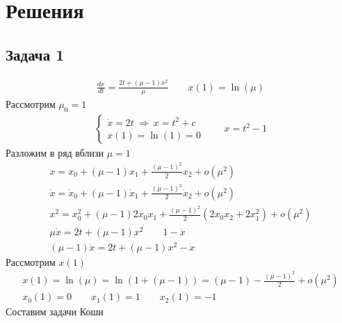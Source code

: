 
\newpage
\section*{Решения}
\subsection*{Задача 1}
	\begin{gather*}
	\frac{d x}{d t} = \frac{2t + (\mu - 1)x^2}{\mu}\qquad x(1) = \ln(\mu)
	\end{gather*}
	Рассмотрим $\mu_0 = 1$
	\begin{gather*}
	\begin{cases}
	\dot{x} = 2t\ \Rightarrow\ x = t^2 + c\\
	x(1) = \ln(1) = 0
	\end{cases}\qquad x = t^2 - 1
	\end{gather*}
	Разложим в ряд вблизи $\mu = 1$
	\begin{gather*}
	x = x_0 + (\mu - 1)x_1 + \frac{(\mu - 1)^2}{2} x_2 + o(\mu^2)\\
	\dot{x} = \dot{x}_0 + (\mu - 1)\dot{x}_1 + \frac{(\mu - 1)^2}{2}\dot{x}_2 + o(\mu^2)\\
	x^2 = x^2_0 + (\mu - 1) 2x_0 x_1 + \frac{(\mu - 1)^2}{2}(2x_0x_2 + 2x_1^2) + o(\mu^2)\\
	\mu \dot{x} = 2t + (\mu - 1)x^2\qquad 1-\dot{x}\\
	(\mu - 1)\dot{x} = 2t + (\mu - 1)x^2 - \dot{x}
	\end{gather*}
	Рассмотрим $x(1)$
	\begin{gather*}
	x(1) = \ln(\mu) = \ln(1 + (\mu - 1)) = (\mu - 1) - \frac{(\mu - 1)^2}{2} + o(\mu^2)\\
	x_0(1) = 0\qquad x_1(1) = 1\qquad x_2(1) = -1
	\end{gather*}
	Составим задачи Коши
